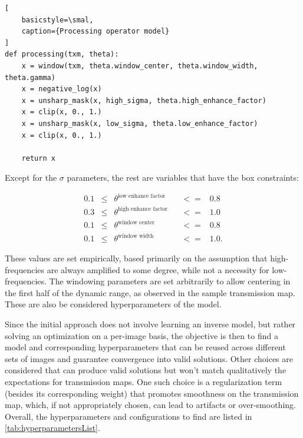 \documentclass[nomenclature, english, bibtex]{kththesis}
\numberwithin{listing}{chapter}
\begin{document}
\begin{lstlisting}[
    basicstyle=\smal,
    caption={Processing operator model}
]
def processing(txm, theta):
    x = window(txm, theta.window_center, theta.window_width, theta.gamma)
    x = negative_log(x)
    x = unsharp_mask(x, high_sigma, theta.high_enhance_factor)
    x = clip(x, 0., 1.)
    x = unsharp_mask(x, low_sigma, theta.low_enhance_factor)
    x = clip(x, 0., 1.)

    return x
\end{lstlisting}

Except for the $\sigma$ parameters, the rest are variables that
have the box constraints:

\begin{equation}
\begin{aligned}
    0.1&  \leq & \theta^{\text{low enhance factor}} && <= &0.8 \\
    0.3 & \leq  &\theta^{\text{high enhance factor}}& & <= &1.0 \\
    0.1 & \leq  &\theta^{\text{window center}} & &<= &0.8 \\
    0.1  &\leq  &\theta^{\text{window width}}&& <= &1.0.
\end{aligned}
\end{equation}

These values are set empirically, based primarily on the assumption that high-frequencies are always amplified to some degree, while not a necessity for low-frequencies. The windowing parameters are set arbitrarily to allow centering in the first
half of the dynamic range, as observed in the sample transmission map. These are also be considered hyperparameters of the model.

Since the initial approach does not involve learning an inverse model, but rather solving an optimization
on a per-image basis, the objective is then to find a model and corresponding hyperparameters that can be reused across different
sets of images and guarantee convergence into valid solutions. Other  choices are considered that can produce valid solutions but won't match qualitatively
the expectations for transmission maps. One such choice is a regularization term (besides its corresponding weight)
that promotes smoothness on the transmission map, which, if not appropriately chosen, can lead to artifacts or over-smoothing.
Overall, the hyperparameters and configurations to find are listed in \autoref{tab:hyperparametersList}.
\end{document}
